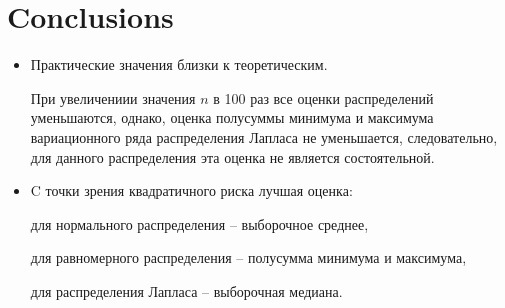 \documentclass[12pt, a4paper]{article}
\begin{document}
\newpage
\section{Conclusions}

\begin{itemize}
    \item Практические значения близки к теоретическим.
    
    При увеличениии значения $n$ в 100 раз все оценки распределений уменьшаются, однако, оценка полусуммы минимума и максимума вариационного ряда распределения Лапласа не уменьшается, следовательно, для данного распределения эта оценка не является состоятельной.
    
    \item C точки зрения квадратичного риска лучшая оценка:
    
    для нормального распределения – выборочное среднее,

    для равномерного распределения – полусумма минимума и максимума,

    для распределения Лапласа – выборочная медиана.
\end{itemize}
\end{document}
